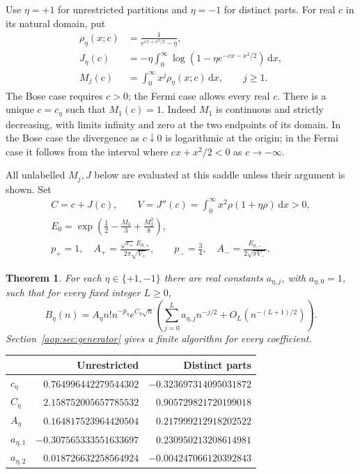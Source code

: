 \documentclass[11pt]{article}
\newtheorem{theorem}{Theorem}[section]
\theoremstyle{remark}\newtheorem{remark}[theorem]{Remark}
\newcommand{\dd}{\,\mathrm d}
\begin{document}
Use $\eta=+1$ for unrestricted partitions and $\eta=-1$ for distinct parts.
For real $c$ in its natural domain, put
\begin{align}
 \rho_\eta(x;c)&=\frac1{e^{cx+x^2/2}-\eta},\label{aop:eq:rho}\\
 J_\eta(c)&=-\eta\int_0^\infty
       \log(1-\eta e^{-cx-x^2/2})\dd x,\\
 M_j(c)&=\int_0^\infty x^j\rho_\eta(x;c)\dd x,\qquad j\ge1.
\end{align}
The Bose case requires $c>0$; the Fermi case allows every real $c$.
There is a unique $c=c_\eta$ such that $M_1(c)=1$. Indeed $M_1$ is
continuous and strictly decreasing, with limits infinity and zero at the
two endpoints of its domain. In the Bose case the divergence as
$c\downarrow0$ is logarithmic at the origin; in the Fermi case it follows
from the interval where $cx+x^2/2<0$ as $c\to-\infty$.

All unlabelled $M_j,J$ below are evaluated at this saddle unless their
argument is shown. Set
\begin{gather}
 C=c+J(c),\qquad
 V=J''(c)=\int_0^\infty x^2\rho(1+\eta\rho)\dd x>0,\label{aop:eq:CV}\\
 E_0=\exp\left(\frac12-\frac{M_3}{3}+\frac{M_2^2}{8}\right),\label{aop:eq:E0}\\
 p_+=1,\quad A_+=\frac{\sqrt{c_+}\,E_{0,+}}{2\pi\sqrt{V_+}},
 \qquad
 p_-=\frac34,\quad A_-=\frac{E_{0,-}}{2\sqrt{\pi V_-}}.\label{aop:eq:A}
\end{gather}

\begin{theorem}\label{aop:thm:main}
For each $\eta\in\{+1,-1\}$ there are real constants $a_{\eta,j}$,
with $a_{\eta,0}=1$, such that for every fixed integer $L\ge0$,
\begin{equation}\label{aop:eq:main}
 B_\eta(n)=A_\eta n!n^{-p_\eta}e^{C_\eta\sqrt n}
 \left(\sum_{j=0}^{L}a_{\eta,j}n^{-j/2}
             +O_L(n^{-(L+1)/2})\right).
\end{equation}
Section~\ref{aop:sec:generator} gives a finite algorithm for every coefficient.
\end{theorem}

\begin{center}\small
\begin{tabular}{@{}lrr@{}}
\toprule
 & Unrestricted & Distinct parts\\
\midrule
$c_\eta$ & $0.764996442279544302$ & $-0.323697314095031872$\\
$C_\eta$ & $2.158752005657785532$ & $0.905729821720199018$\\
$A_\eta$ & $0.164817523964420504$ & $0.217999212918202522$\\
$a_{\eta,1}$ & $-0.307565333551633697$ & $0.230950213208614981$\\
$a_{\eta,2}$ & $0.018726632258564924$ & $-0.004247066120392843$\\
\bottomrule
\end{tabular}
\end{center}
\end{document}
